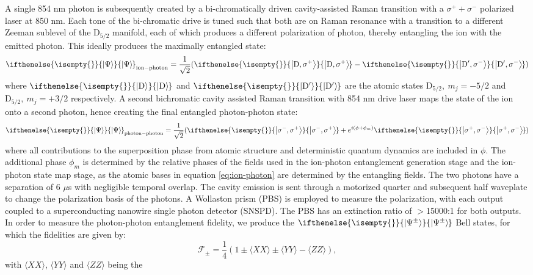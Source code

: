 \documentclass[aps,prl,twocolumn,floatfix,superscriptaddress]{revtex4-2}
\newcommand{\ket}[2][]{
	\ifthenelse{\isempty{#1}}
	{\ensuremath{\xspace\left\vert #2 \right\rangle\xspace}}
	{\ensuremath{\xspace\left\vert #2 \right\rangle_{\! #1}\xspace}}
	}
\begin{document}
A single 854 nm photon is subsequently created by a bi-chromatically driven cavity-assisted Raman transition with a $\sigma^+ + \sigma^-$ polarized laser at 850 nm. Each tone of the bi-chromatic drive is tuned such that both are on Raman resonance with a transition to a different Zeeman sublevel of the D$_{5/2}$ manifold, each of which produces a different polarization of photon, thereby entangling the ion with the emitted photon.
This ideally produces the maximally entangled state:
\begin{equation}
    \ket{\Psi}_{\mathrm{ion-photon}} = \frac{1}{\sqrt{2}}(\ket{\mathrm{D}, \sigma^+} - \ket{\mathrm{D}', \sigma^-})
    \label{eq:ion-photon}
\end{equation}
 where $\ket{\mathrm{D}}$ and $\ket{\mathrm{D}'}$ are the atomic states $\mathrm{D}_{5/2},\:m_j=-5/2$ and $\mathrm{D}_{5/2},\:m_j=+3/2$ respectively.
A second bichromatic cavity assisted Raman transition with 854 nm drive laser maps the state of the ion onto a second photon, hence creating the final entangled photon-photon state:
\begin{equation}
    \ket{\Psi}_{\mathrm{photon-photon}} = \frac{1}{\sqrt{2}}(\ket{\sigma^-, \sigma^+} + e^{i(\phi+\phi_m)} \ket{\sigma^+, \sigma^-})
    \label{eq:photon-photon}
\end{equation}
where all contributions to the superposition phase from atomic structure and deterministic quantum dynamics are included in $\phi$.
The additional phase $\phi_m$ is determined by the relative phases of the fields used in the ion-photon entanglement generation stage and the ion-photon state map stage, as the atomic bases in equation \ref{eq:ion-photon} are determined by the entangling fields.
The two photons have a separation of $6$ $\mu$s with negligible temporal overlap.
The cavity emission is sent through a motorized quarter and subsequent half waveplate to change the polarization basis of the photons. A Wollaston prism (PBS) is employed to measure the polarization, with each output coupled to a superconducting nanowire single photon detector (SNSPD). The PBS has an extinction ratio of $>$15000:1 for both outputs.
In order to measure the photon-photon entanglement fidelity, we produce the $\ket{\Psi^{\pm}}$ Bell states, for which the fidelities are given by:
\begin{equation}
    \mathcal{F}_{\pm} = \frac{1}{4}(1 \pm \langle XX \rangle \pm \langle YY \rangle - \langle ZZ \rangle),
    \label{eq:Fidelity}
\end{equation}
with $\langle XX \rangle$, $\langle YY \rangle$ and $\langle ZZ \rangle$ being the
\end{document}
